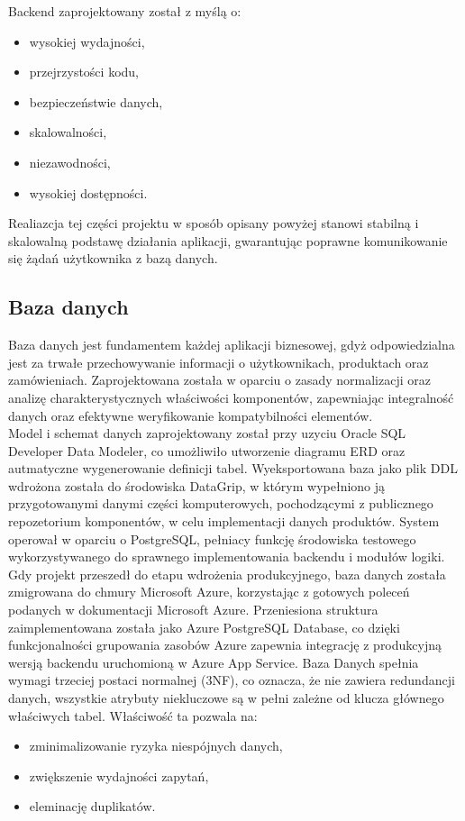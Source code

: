 \documentclass[a4paper,twoside,12pt]{book}
\begin{document}
\newpage

Backend zaprojektowany został z myślą o:
\begin{itemize}
    \item wysokiej wydajności,
    \item przejrzystości kodu,
    \item bezpieczeństwie danych,
    \item skalowalności,
    \item niezawodności,
    \item wysokiej dostępności.
\end{itemize}

Realiazcja tej części projektu w sposób opisany powyżej stanowi stabilną i skalowalną podstawę działania aplikacji, gwarantując poprawne komunikowanie się żądań użytkownika z bazą danych.
\subsection{Baza danych}

Baza danych jest fundamentem każdej aplikacji biznesowej, gdyż odpowiedzialna jest za trwałe przechowywanie informacji o użytkownikach, produktach oraz zamówieniach. Zaprojektowana została  w oparciu o zasady normalizacji oraz analizę charakterystycznych właściwości komponentów, zapewniając integralność danych oraz efektywne weryfikowanie kompatybilności elementów.
\vspace{0.5cm}
\\
Model i schemat danych zaprojektowany został przy uzyciu Oracle SQL Developer Data Modeler, co umożliwiło utworzenie diagramu ERD oraz autmatyczne wygenerowanie definicji tabel. Wyeksportowana baza jako plik DDL wdrożona została do środowiska DataGrip, w którym wypełniono ją przygotowanymi danymi części komputerowych, pochodzącymi z publicznego repozetorium komponentów\cite{pc_git}, w celu implementacji danych produktów. System operował w oparciu o PostgreSQL, pełniacy funkcję środowiska testowego wykorzystywanego do sprawnego implementowania backendu i modułów logiki. Gdy projekt przeszedł do etapu wdrożenia produkcyjnego, baza danych została zmigrowana do chmury Microsoft Azure, korzystając z gotowych poleceń podanych w dokumentacji Microsoft Azure\cite{azure_mig}. Przeniesiona struktura zaimplementowana została jako Azure PostgreSQL Database, co dzięki funkcjonalności grupowania zasobów Azure zapewnia integrację z produkcyjną wersją backendu uruchomioną w Azure App Service.
\newpage
Baza Danych spełnia wymagi trzeciej postaci normalnej (3NF), co oznacza, że nie zawiera redundancji danych, wszystkie atrybuty niekluczowe są w pełni zależne od klucza głównego właściwych tabel. Właściwość ta pozwala na:
\begin{itemize}
    \item zminimalizowanie ryzyka niespójnych danych,
    \item zwiększenie wydajności zapytań,
    \item eleminację duplikatów.
\end{itemize}
\vspace{0.5cm}
\end{document}
